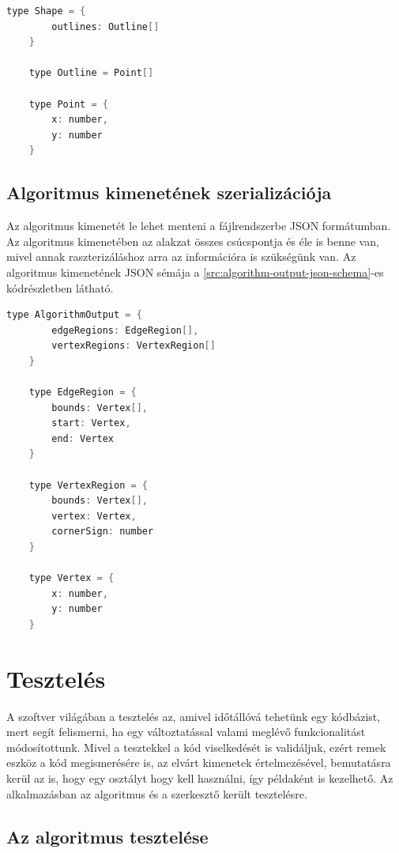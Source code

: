 \begin{lstlisting}[language=C]
	type Shape = {
		outlines: Outline[]
	}

	type Outline = Point[]

	type Point = {
		x: number,
		y: number
	}
\end{lstlisting}


\subsection{Algoritmus kimenetének szerializációja}
Az algoritmus kimenetét le lehet menteni a fájlrendszerbe JSON formátumban. Az algoritmus kimenetében az alakzat összes csúcspontja és éle is benne van, mivel annak raszterizáláshoz arra az információra is szükségünk van. Az algoritmus kimenetének JSON sémája a \ref{src:algorithm-output-json-schema}-es kódrészletben látható.

\begin{lstlisting}[language=C]
	type AlgorithmOutput = {
		edgeRegions: EdgeRegion[],
		vertexRegions: VertexRegion[]
	}

	type EdgeRegion = {
		bounds: Vertex[],
		start: Vertex,
		end: Vertex
	}

	type VertexRegion = {
		bounds: Vertex[],
		vertex: Vertex,
		cornerSign: number
	}

	type Vertex = {
		x: number,
		y: number
	}
\end{lstlisting}


\section{Tesztelés}

A szoftver világában a tesztelés az, amivel időtállóvá tehetünk egy kódbázist, mert segít felismerni, ha egy változtatással valami meglévő funkcionalitást módosítottunk. Mivel a tesztekkel a kód viselkedését is validáljuk, ezért remek eszköz a kód megismerésére is, az elvárt kimenetek értelmezésével, bemutatásra kerül az is, hogy egy osztályt hogy kell használni, így példaként is kezelhető.
Az alkalmazásban az algoritmus és a szerkesztő került tesztelésre.

\subsection{Az algoritmus tesztelése}

